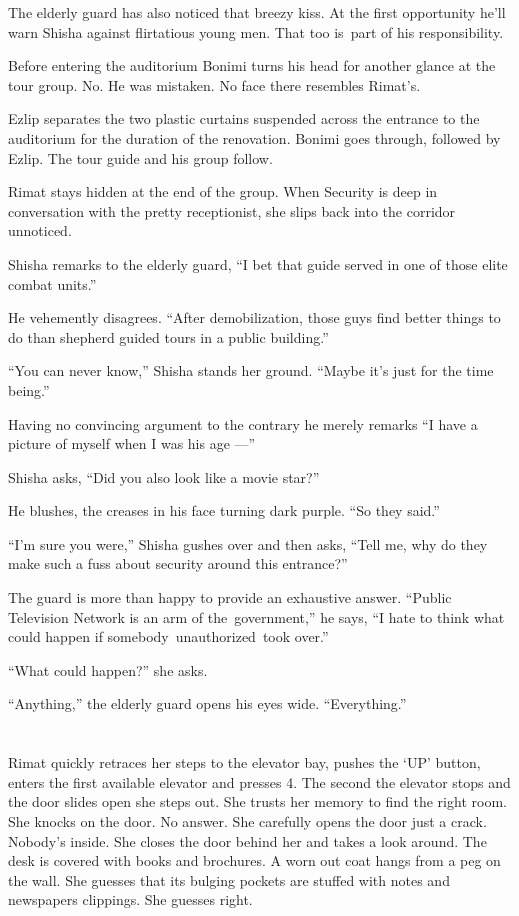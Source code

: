 \documentclass[twoside,11pt,openany]{book}
\begin{document}
The elderly guard has also noticed that breezy kiss. \MakeUppercase{A}t the first opportunity he'll warn Shisha against
flirtatious young men. That too is~part of his responsibility.

Before entering the auditorium Bonimi turns his head for another glance at the tour group. No. He was mistaken. No
face there resembles Rimat's.

Ezlip separates the two plastic curtains suspended across the entrance to the auditorium for the duration of the
renovation. Bonimi goes through, followed by Ezlip. The tour guide and his group follow.

Rimat stays hidden at the end of the group. When Security is deep in conversation with the pretty receptionist, she
slips back into the corridor unnoticed.

Shisha remarks to the elderly guard, ``I bet that guide served in one of those elite combat
units.''

He vehemently disagrees. ``After demobilization, those guys find better things to do than shepherd guided
tours in a public building.''

``You can never know,'' Shisha stands her ground. ``Maybe it's just for the time
being.''

Having no convincing argument to the contrary he merely remarks ``I have a picture of myself when I was his
age ---''

Shisha asks, ``Did you also look like a movie star?''

He blushes, the creases in his face turning dark purple. ``So they said.''

``I'm sure you were,'' Shisha gushes over and then asks, ``Tell me, why do they
make such a fuss about security around this entrance?''

The guard is more than happy to provide an exhaustive answer. ``Public Television Network is an arm of
the~government,'' he says, ``I hate to think what could happen if somebody~unauthorized~took
over.''

``What could happen?'' she asks.

``Anything,'' the elderly guard opens his eyes wide.
``Everything.''



\chapter{}

Rimat quickly retraces her steps to the elevator bay, pushes the `UP' button, enters the first available elevator and
presses 4. The second the elevator stops and the door slides open she steps out. She trusts her memory to find the
right room. She knocks on the door. No answer. She carefully opens the door just a crack. Nobody's inside. She closes
the door behind her and takes a look around. The desk is covered with books and brochures. A worn out coat hangs from
a peg on the wall. She guesses that its bulging pockets are stuffed with notes and{ }newspapers
clippings. She guesses right.
\end{document}
